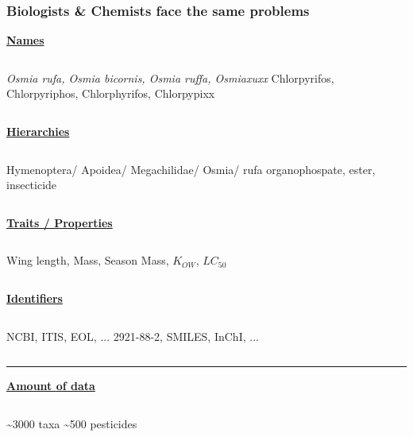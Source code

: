 \documentclass[
	12pt
	]{beamer}
\begin{document}
\begin{frame}
\frametitle{Biologists \& Chemists face the same problems}
	\small
	\centering
	\pause
	\textbf{\alert{\underline{Names}}}
	\begin{columns}[t]
	\emph{Osmia rufa, Osmia bicornis, Osmia ruffa, Osmiaxuxx} 
	Chlorpyrifos, Chlorpyriphos, Chlorphyrifos, Chlorpypixx
	\end{columns}
	\pause

	\centering
	\textbf{\alert{\underline{Hierarchies}}}
	\begin{columns}[t]
	Hymenoptera/ Apoidea/ Megachilidae/ Osmia/ rufa 
	organophospate, ester, insecticide
	\end{columns}
	\pause

	\centering
	\textbf{\alert{\underline{Traits / Properties}}}
	\begin{columns}[t]
	Wing length, Mass, Season 
	Mass, $K_{OW}$, $LC_{50}$
	\end{columns}
	\pause

	\centering
	\textbf{\alert{\underline{Identifiers}}}
	\begin{columns}[t]
	NCBI, ITIS, EOL, ... 
	2921-88-2, SMILES, InChI, ...
	\end{columns}
	\pause

	\rule{\textwidth}{1pt}
	\textbf{\alert{\underline{Amount of data}}}

	\begin{columns}[t]
	\centering
	\textasciitilde 3000 taxa
	\centering
	\textasciitilde 500 pesticides
	\end{columns}
\end{frame}
\end{document}
